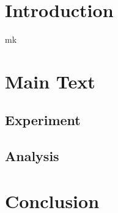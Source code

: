 \documentclass[
    column = onecolumn,
    ref = refDemo
]{spArticle}
\begin{document}
    \section{Introduction}
        \lipsum[2-5]
mk 
    \section{Main Text}
        \subsection{Experiment}
            \lipsum[6-8]
        \subsection{Analysis}
            \lipsum[9-11]

    \section{Conclusion}
        \lipsum[12-14]
\end{document}
